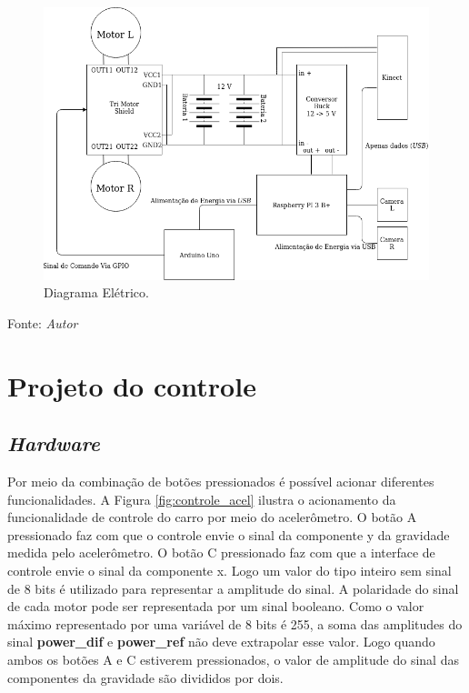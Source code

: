 \begin{figure}[!htb]
  \centering
  \caption{Diagrama Elétrico.}
  \label{fig:diagrama_eletrico}
  \includegraphics[width=1\textwidth]{./img/projeto/diagrama_eletrico.png}
\end{figure}
Fonte: \textit{Autor}
\pagebreak

\section{Projeto do controle}

\subsection{\textit{Hardware}}

Por meio da combinação de botões pressionados é possível acionar diferentes funcionalidades. 
A Figura \ref{fig:controle_acel} ilustra o acionamento da funcionalidade de controle do carro por meio do acelerômetro. O botão A pressionado faz com que o controle envie o sinal da componente y da gravidade medida pelo acelerômetro. 
O botão C pressionado faz com que a interface de controle envie o sinal da componente x. 
Logo um valor do tipo inteiro sem sinal de 8 bits é utilizado para representar a amplitude do sinal.
A polaridade do sinal de cada motor pode ser representada por um sinal booleano.
Como o valor máximo representado por uma variável de 8 bits é 255, a soma das amplitudes do sinal \textbf{power\_dif} e \textbf{power\_ref} não deve extrapolar esse valor. Logo quando ambos os botões A e C estiverem pressionados, o valor de amplitude do sinal das componentes da gravidade são divididos por dois. 

